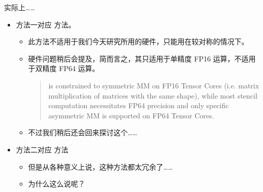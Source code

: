 \documentclass[aspectratio=169,10pt]{beamer}
\newenvironment{paperquote}{%
  \begin{quote}\small\itshape\color{black!72}%
}{%
  \end{quote}%
}
\begin{document}
\begin{frame}[fragile]{实际上……}
\begin{itemize}
\item 方法一对应 \texttt{} 方法。
\begin{itemize}
\item 此方法不适用于我们今天研究所用的硬件，只能用在较对称的情况下。
\item 硬件问题稍后会提及，简而言之，其只适用于单精度 FP16 运算，不适用于双精度 FP64 运算。
\begin{paperquote}
\texttt{} is constrained to symmetric MM on FP16 Tensor Cores (i.e. matrix multiplication of matrices with the same shape), while most stencil computation necessitates FP64 precision and only specific asymmetric MM is supported on FP64 Tensor Cores.
\end{paperquote}
\item 不过我们稍后还会回来探讨这个……
\end{itemize}
\item 方法二对应 \texttt{} 方法
\begin{itemize}
\item 但是从各种意义上说，这种方法都太冗余了……
\item 为什么这么说呢？
\end{itemize}
\end{itemize}
\end{frame}
\end{document}
